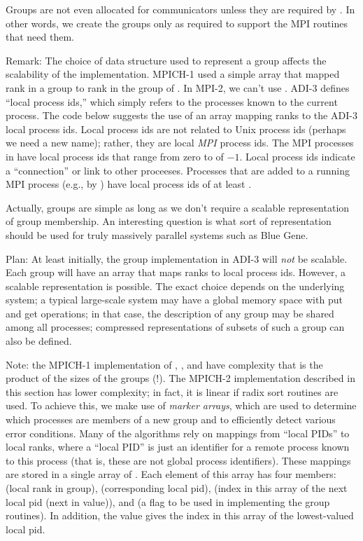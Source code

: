 \documentclass{article}
\begin{document}
Groups are not even allocated for communicators unless they are
required by .  In other words, we create the
groups only as required to support the MPI routines that need them.

Remark: The choice of data structure used to represent a group affects
the scalability of the implementation.
MPICH-1 used a simple array that mapped rank in a group to rank in the
group of .  In MPI-2, we can't use
.  ADI-3 defines ``local process ids,'' which
simply refers to the processes known to the current process.  The code below
suggests the use of an array mapping ranks to the ADI-3 local process
ids.  Local 
process ids are not related to Unix process ids (perhaps we need a new name);
rather, they are local \emph{MPI} process ids.  The MPI processes in
 have local process ids that range from zero to
 of  $-1$.  Local process ids
indicate a ``connection'' or link to other proceeses.
Processes that are added to a
running MPI process (e.g., by ) have local process ids
of at least .

Actually, groups are simple as long as we don't require a scalable
representation of group membership.  An interesting question is what
sort of representation should be used for truly massively parallel
systems such as Blue Gene.  

Plan: At least initially, the group implementation in ADI-3 will \emph{not} be
scalable.  Each group will have an array that maps ranks to local
process ids.
However, a scalable representation is possible.  The exact choice
depends on the underlying system; a typical large-scale system may
have a global memory space with put and get operations; in that case,
the description of any group may be shared among all processes;
compressed representations of subsets of such a group can also be defined.

Note: the MPICH-1 implementation of ,
, and  have complexity
that is the product of the sizes of the groups (!).  The MPICH-2
implementation described in this section has lower complexity; in
fact, it is linear if radix sort routines are used.
To achieve this, we make use of \emph{marker arrays}, which are used
to determine which processes are members of a new group and to
efficiently detect various error conditions.  Many of the algorithms
rely on mappings from ``local PIDs'' to local ranks, where a ``local
PID'' is just an identifier for a remote process known to this process
(that is, these are not global process identifiers). 
These mappings are stored in a single array of .
Each element of this array has four members:
 (local rank in group), 
 (corresponding local pid),
 (index in this array of the next
local pid (next in value)), and 
 (a flag to be used in implementing the
group routines).  In addition, the value
 gives the index in this array of
the lowest-valued local pid.
\end{document}
